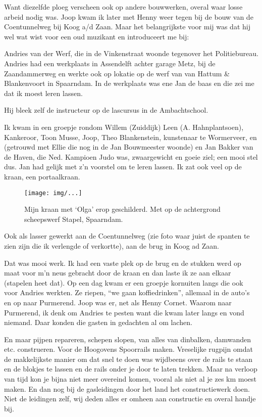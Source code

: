\documentclass[10pt,twoside,openright]{memoir}
\begin{document}
Want diezelfde ploeg verscheen ook op andere bouwwerken, overal waar losse arbeid nodig was. Joop kwam ik later met Henny weer tegen bij de bouw van de Coentunnelweg bij Koog a/d Zaan. Maar het belangrijkste voor mij was dat hij wel wat wist voor een oud muzikant en introduceert me bij: 

Andries van der Werf, die in de Vinkenstraat woonde tegenover het Politiebureau. Andries had een werkplaats in Assendelft achter garage Metz, bij de Zaandammerweg en werkte ook op lokatie op de werf van van Hattum \& Blankenvoort in Spaarndam. In de werkplaats was ene Jan de baas en die zei me dat ik moest leren lassen. 

Hij bleek zelf de instructeur op de lascursus in de Ambachtschool. 

Ik kwam in een groepje rondom Willem (Zuiddijk) Leen (A. Hahnplantsoen), Kankeroor, Toon Musse, Joop, Theo Blankenstein, kunstenaar te Wormerveer, en (getrouwd met Ellie die nog in de Jan Bouwmeester woonde) en Jan Bakker van de Haven, die Ned. Kampioen Judo was, zwaargewicht en goeie ziel; een mooi stel dus. Jan had gelijk met z’n voorstel om te leren lassen. Ik zat ook veel op de kraan, een portaalkraan. 

\begin{figure}[t]
\texttt{[image: img/...]}
\caption{Mijn kraan met ‘Olga’ erop geschilderd. Met op de achtergrond scheepswerf Stapel, Spaarndam.}
\end{figure}

Ook als lasser gewerkt aan de Coentunnelweg (zie foto waar juist de spanten te zien zijn die ik verlengde of verkortte), aan de brug in Koog ad Zaan. 

Dat was mooi werk. Ik had een vaste plek op de brug en de stukken werd op maat voor m’n neus gebracht door de kraan en dan laste ik ze aan elkaar (stapelen heet dat). Op een dag kwam er een groepje kornuiten langs die ook voor Andries werkten. Ze riepen, ``we gaan koffiedrinken'', allemaal in de auto’s en op naar Purmerend. Joop was er, net als Henny Cornet. Waarom naar Purmerend, ik denk om Andries te pesten want die kwam later langs en vond niemand. Daar konden die gasten in gedachten al om lachen.

En maar pijpen repareren, schepen slopen, van alles van dinbalken, damwanden etc. construeren. Voor de Hoogovens Spoorrails maken. Vreselijke rugpijn omdat de makkelijkste manier om dat snel te doen was wijdbeens over de rails te staan en de blokjes te lassen en de rails onder je door te laten trekken. Maar na verloop van tijd kon je bijna niet meer overeind komen, vooral als niet al je zes km moest maken. En dan nog bij de gasleidingen door het land het constructiewerk doen. Niet de leidingen zelf, wij deden alles er omheen aan constructie en overal handje bij.
\end{document}
